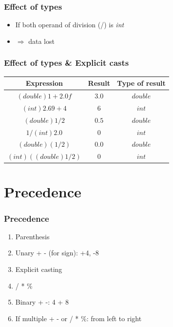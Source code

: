 \documentclass{../c-lecture}
\begin{document}
\begin{frame}
  \frametitle{Effect of types}
  \begin{itemize}
    \item
      If both operand of division (/) is \textit{\color{Orange} int}
    \item $\Rightarrow$ data lost
  \end{itemize}
\end{frame}

\begin{frame}
  \frametitle{Effect of types \& Explicit casts}
  \begin{table}
  \begin{tabular}{ccc}
    \toprule

    Expression &
    Result &
    Type of result \\

    \midrule

    $(double) 1 + 2.0f$ &
    $3.0$ &
    $double$ \\

    \midrule

    $(int) 2.69 + 4$ &
    $6$ &
    $int$ \\

    \midrule

    $(double) 1 / 2$ &
    $0.5$ &
    $double$ \\

    \midrule

    $1 / (int) 2.0$ &
    $0$ &
    $int$ \\

    \midrule

    $(double) (1 / 2)$ &
    $0.0$ &
    $double$ \\

    \midrule

    $(int)((double) 1 / 2)$ &
    $0$ &
    $int$ \\

    \bottomrule
  \end{tabular}
  \end{table}
\end{frame}

\section{Precedence}

\begin{frame}
  \frametitle{Precedence}
  \begin{enumerate}
    \item Parenthesis
    \item Unary + - (for sign): +4, -8
    \item Explicit casting
    \item / * \%
    \item Binary + -: 4 + 8
    \item If multiple + - or / * \%: from left to right
  \end{enumerate}
\end{frame}
\end{document}
